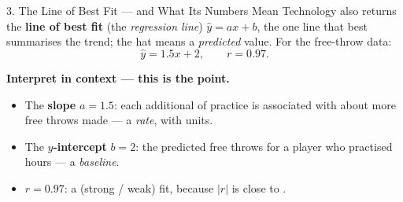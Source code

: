 \documentclass[10pt]{article}
\newcommand{\lgrid}[4]{%
  \draw[step=1, linegray!40, very thin] (#1,#3) grid (#2,#4);
  \draw[->, semithick, charcoal] (#1,0)--(#2,0) node[below right, font=\scriptsize]{$x$};
  \draw[->, semithick, charcoal] (0,#3)--(0,#4) node[left, font=\scriptsize]{$y$};}
\newcommand{\dpt}[2]{\fill[navy] (#1,#2) circle (2.6pt);}
\newcommand{\ftdata}{\dpt{1}{4}\dpt{2}{4}\dpt{3}{7}\dpt{4}{7}\dpt{5}{11}\dpt{6}{11}\dpt{7}{12}\dpt{8}{14}}
\begin{document}
\boxguard[12]
\begin{notesbox}{3. The Line of Best Fit --- and What Its Numbers Mean}
Technology also returns the \textbf{line of best fit} (the \emph{regression line}) $\hat y=ax+b$,
the one line that best summarises the trend; the hat means a \emph{predicted} value. For the
free-throw data:
\[ \hat y = 1.5x + 2, \qquad r = 0.97. \]
\begin{center}
\begin{minipage}[c]{0.40\linewidth}\centering
{}
\end{minipage}\hfill
\begin{minipage}[c]{0.56\linewidth}
\textbf{Interpret in context --- this is the point.}
\begin{itemize}[leftmargin=1.5em, itemsep=2pt]
  \item The \textbf{slope} $a=1.5$: each additional  of practice is associated
        with about  more free throws made --- a \emph{rate}, with units.
  \item The \textbf{$y$-intercept} $b=2$: the predicted free throws for a player who practised
         hours --- a \emph{baseline}.
  \item $r=0.97$: a  (strong / weak) fit, because $|r|$ is close to .
\end{itemize}
\end{minipage}
\end{center}
\end{notesbox}
\end{document}
